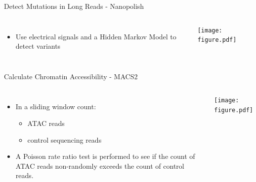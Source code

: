 \documentclass{beamer}
\begin{document}
\begin{frame}{Detect Mutations in Long Reads - Nanopolish}
\begin{columns}
\begin{itemize}
	\item Use electrical signals and a Hidden Markov Model to detect variants
\end{itemize}
\centering
\texttt{[image: figure.pdf]}
\end{columns}
\end{frame}

\begin{frame}{Calculate Chromatin Accessibility - MACS2}
\begin{columns}
\begin{itemize}
	\item In a sliding window count:
	\begin{itemize}
		\item ATAC reads
		\item control sequencing reads
	\end{itemize}
	\item A Poisson rate ratio test is performed to see if the count of ATAC reads non-randomly exceeds the count of control reads.
\end{itemize}
\texttt{[image: figure.pdf]}
\end{columns}
\end{frame}
\end{document}
